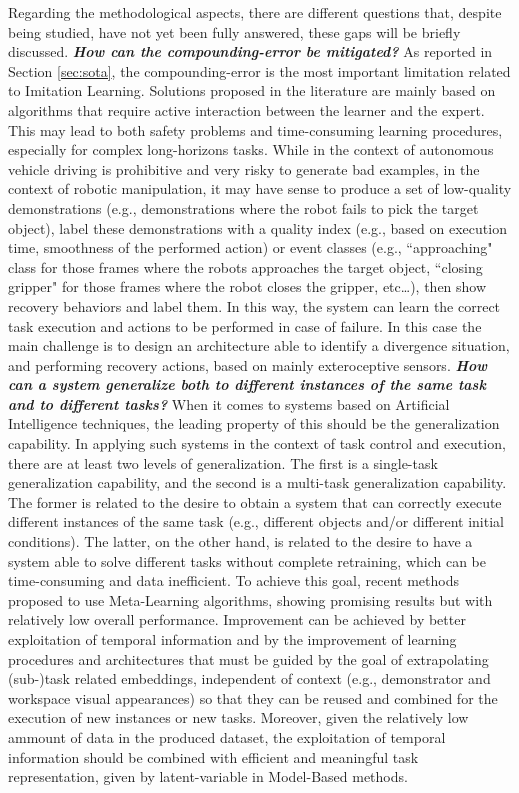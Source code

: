 Regarding the methodological aspects, there are different questions that, despite being studied, have not yet been fully answered, these gaps will be briefly discussed.
\newline \textbf{\textit{How can the compounding-error be mitigated?}} As reported in Section \ref{sec:sota}, the compounding-error is the most important limitation related to Imitation Learning. Solutions proposed in the literature are mainly based on algorithms that require active interaction between the learner and the expert. This may lead to both safety problems and time-consuming learning procedures, especially for complex long-horizons tasks. While in the context of autonomous vehicle driving is prohibitive and very risky to generate bad examples, in the context of robotic manipulation, it may have sense to produce a set of low-quality demonstrations (e.g., demonstrations where the robot fails to pick the target object), label these demonstrations with a quality index (e.g., based on execution time, smoothness of the performed action) or event classes (e.g., ``approaching" class for those frames where the robots approaches the target object, ``closing gripper" for those frames where the robot closes the gripper, etc\dots), then show recovery behaviors and label them. In this way, the system can learn the correct task execution and actions to be performed in case of failure. In this case the main challenge is to design an architecture able to identify a divergence situation, and performing recovery actions, based on mainly exteroceptive sensors. 
\newline \textbf{\textit{How can a system generalize both to different instances of the same task and to different tasks?}} When it comes to systems based on Artificial Intelligence techniques, the leading property of this should be the generalization capability. In applying such systems in the context of task control and execution, there are at least two levels of generalization. The first is a single-task generalization capability, and the second is a multi-task generalization capability. The former is related to the desire to obtain a system that can correctly execute different instances of the same task (e.g., different objects and/or different initial conditions). The latter, on the other hand, is related to the desire to have a system able to solve different tasks without complete retraining, which can be time-consuming and data inefficient. To achieve this goal, recent methods proposed to use Meta-Learning algorithms, showing promising results but with relatively low overall performance. Improvement can be achieved by better exploitation of temporal information and by the improvement of learning procedures and architectures that must be guided by the goal of extrapolating (sub-)task related embeddings, independent of context (e.g., demonstrator and workspace visual appearances) so that they can be reused and combined for the execution of new instances or new tasks. Moreover, given the relatively low ammount of data in the produced dataset, the exploitation of temporal information should be combined with efficient and meaningful task representation, given by latent-variable in Model-Based methods.
